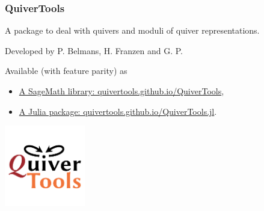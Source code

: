 \documentclass{beamer}
\begin{document}
\begin{frame}
    \frametitle{QuiverTools}
A package to deal with quivers and moduli of quiver representations. \pause

Developed by P. Belmans, H. Franzen and G. P. \pause

Available (with feature parity) as

\begin{itemize}
    \item \href{quivertools.github.io/QuiverTools}{A SageMath library: quivertools.github.io/QuiverTools},
    \item \href{quivertools.github.io/QuiverTools.jl}{A Julia package: quivertools.github.io/QuiverTools.jl}.
\end{itemize}\pause
\begin{center}
\includegraphics[width=100pt]{quivertools-logo.png}
\end{center}
\end{frame}
\end{document}
